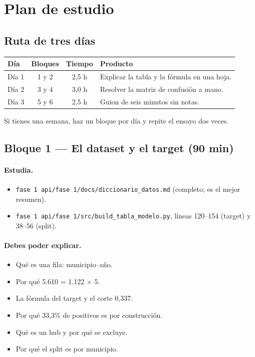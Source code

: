 \documentclass[11pt,a4paper]{article}
\newcommand{\code}[1]{\texttt{#1}}
\begin{document}
\section{Plan de estudio}

\subsection{Ruta de tres días}

\begin{table}[H]
\centering
\small
\begin{tabularx}{\textwidth}{@{}l c c Y@{}}
\toprule
\textbf{Día} & \textbf{Bloques} & \textbf{Tiempo} & \textbf{Producto} \\
\midrule
Día 1 & 1 y 2 & 2,5 h & Explicar la tabla y la fórmula en una hoja. \\
Día 2 & 3 y 4 & 3,0 h & Resolver la matriz de confusión a mano. \\
Día 3 & 5 y 6 & 2,5 h & Guion de seis minutos sin notas. \\
\bottomrule
\end{tabularx}
\end{table}

Si tienes una semana, haz un bloque por día y repite el ensayo dos veces.

\subsection{Bloque 1 --- El dataset y el target (90 min)}

\paragraph{Estudia.}
\begin{itemize}[leftmargin=*]
  \item \code{fase 1 api/fase 1/docs/diccionario_datos.md} (completo; es el mejor resumen).
  \item \code{fase 1 api/fase 1/src/build_tabla_modelo.py}, líneas 120--154 (target) y 38--56 (split).
\end{itemize}

\paragraph{Debes poder explicar.}
\begin{itemize}[leftmargin=*]
  \item Qué es una fila: municipio--año.
  \item Por qué 5.610 = 1.122 $\times$ 5.
  \item La fórmula del target y el corte 0,337.
  \item Por qué 33,3\% de positivos es por construcción.
  \item Qué es un hub y por qué se excluye.
  \item Por qué el split es por municipio.
\end{itemize}
\end{document}
